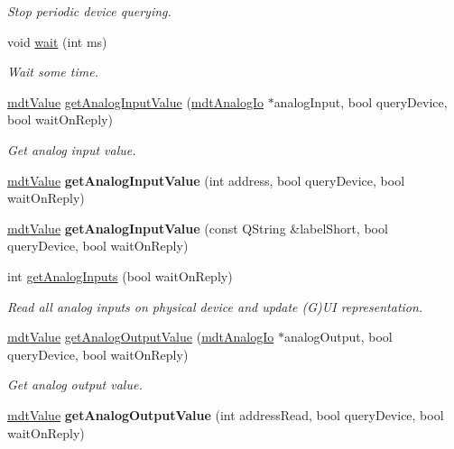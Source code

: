 \begin{DoxyCompactItemize}
\begin{DoxyCompactList}\small\item\em Stop periodic device querying. \end{DoxyCompactList}\item 
void \hyperlink{classmdt_device_a6def09a050cbf3521b615e8300c42f66}{wait} (int ms)
\begin{DoxyCompactList}\small\item\em Wait some time. \end{DoxyCompactList}\item 
\hyperlink{classmdt_value}{mdtValue} \hyperlink{classmdt_device_ab828764660ba53ffce1995901ddf5a0a}{getAnalogInputValue} (\hyperlink{classmdt_analog_io}{mdtAnalogIo} $\ast$analogInput, bool queryDevice, bool waitOnReply)
\begin{DoxyCompactList}\small\item\em Get analog input value. \end{DoxyCompactList}\item 
\hypertarget{classmdt_device_ad6a9d73cd51ce21f69dc8e4646d4fcfe}{
\hyperlink{classmdt_value}{mdtValue} {\bfseries getAnalogInputValue} (int address, bool queryDevice, bool waitOnReply)}
\label{classmdt_device_ad6a9d73cd51ce21f69dc8e4646d4fcfe}

\item 
\hypertarget{classmdt_device_a66a4c466dd6cb5c8235850f6dc23ae7b}{
\hyperlink{classmdt_value}{mdtValue} {\bfseries getAnalogInputValue} (const QString \&labelShort, bool queryDevice, bool waitOnReply)}
\label{classmdt_device_a66a4c466dd6cb5c8235850f6dc23ae7b}

\item 
int \hyperlink{classmdt_device_a98cba3132db15317daf54eb701388e91}{getAnalogInputs} (bool waitOnReply)
\begin{DoxyCompactList}\small\item\em Read all analog inputs on physical device and update (G)UI representation. \end{DoxyCompactList}\item 
\hyperlink{classmdt_value}{mdtValue} \hyperlink{classmdt_device_a163ee286d905feafe50b3e4351d4bf41}{getAnalogOutputValue} (\hyperlink{classmdt_analog_io}{mdtAnalogIo} $\ast$analogOutput, bool queryDevice, bool waitOnReply)
\begin{DoxyCompactList}\small\item\em Get analog output value. \end{DoxyCompactList}\item 
\hypertarget{classmdt_device_aa90eb1111d6778f4227224d3b1804ae7}{
\hyperlink{classmdt_value}{mdtValue} {\bfseries getAnalogOutputValue} (int addressRead, bool queryDevice, bool waitOnReply)}
\label{classmdt_device_aa90eb1111d6778f4227224d3b1804ae7}


\end{DoxyCompactItemize}
